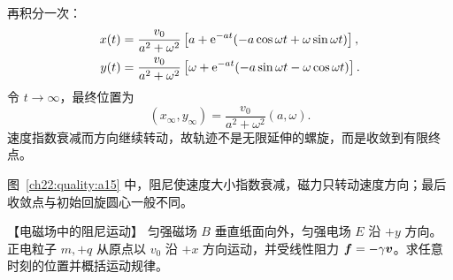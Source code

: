 {\begin{xesolution}
\begin{rTwoFigure}
\end{rTwoFigure}
再积分一次：
\begin{align}
  x(t)&=\frac{v_0}{a^2+\omega^2}
  \left[a+\mathrm e^{-at}(-a\cos\omega t+\omega\sin\omega t)\right],\\
  y(t)&=\frac{v_0}{a^2+\omega^2}
  \left[\omega+\mathrm e^{-at}(-a\sin\omega t-\omega\cos\omega t)\right].
\end{align}
令 $t\to\infty$，最终位置为
\begin{equation}
  \boxed{(x_\infty,y_\infty)=
  \frac{v_0}{a^2+\omega^2}(a,\omega)}.
\end{equation}
速度指数衰减而方向继续转动，故轨迹不是无限延伸的螺旋，而是收敛到有限终点。


图~\ref{ch22:quality:a15} 中，阻尼使速度大小指数衰减，磁力只转动速度方向；最后收敛点与初始回旋圆心一般不同。
\end{xesolution}



\begin{origexamplebox}{【电磁场中的阻尼运动】}\label{ch22:ex:s38-7-16}
匀强磁场 $B$ 垂直纸面向外，匀强电场 $E$ 沿 $+y$ 方向。正电粒子 $m,+q$ 从原点以 $v_0$ 沿
$+x$ 方向运动，并受线性阻力 $\bm{f}=-\gamma\bm{v}$。求任意时刻的位置并概括运动规律。

\begin{center}\begin{minipage}{.96\linewidth}\centering
{}
\end{minipage}\end{center}
\end{origexamplebox}\par\nopagebreak[4]

}
